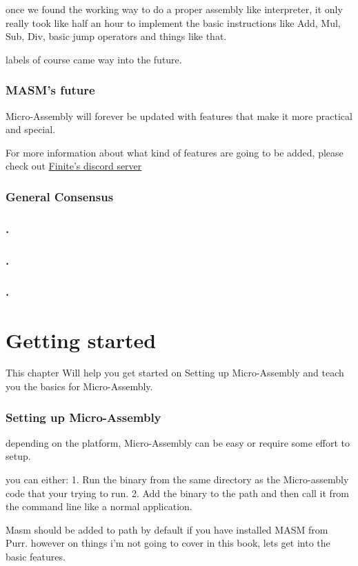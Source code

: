 \documentclass[a4paper,11pt]{book}
\begin{document}
once we found the working way to do a proper assembly like interpreter, it only really took like half an hour to implement the basic instructions like Add, Mul, Sub, Div, basic jump operators and things like that.

labels of course came way into the future.

\subsection{MASM's future}
Micro-Assembly will forever be updated with features that make it more practical and special.

For more information about what kind of features are going to be added, please check out
\hyperref{https://discord.finite.ovh}{}{}{Finite's discord server}


\subsection{General Consensus}
\subsection{.}
\subsection{.}
\subsection{.}

\chapter{Getting started}
This chapter Will help you get started on Setting up Micro-Assembly and teach you the basics for Micro-Assembly.
\subsection{Setting up Micro-Assembly}\label{setup:masm}
depending on the platform, Micro-Assembly can be easy or require some effort to setup.

you can either:
1. Run the binary from the same directory as the Micro-assembly code that your trying to run.
2. Add the binary to the path and then call it from the command line like a normal application.

Masm should be added to path by default if you have installed MASM from Purr.
however on things i'm not going to cover in this book, lets get into the basic features.
\end{document}
